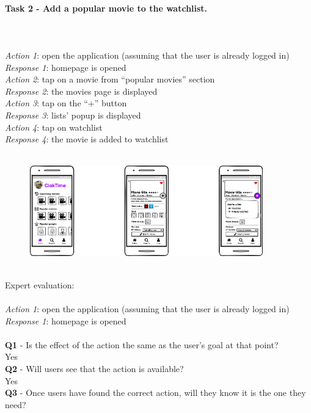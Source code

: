\documentclass[12pt, a4paper]{article}
\numberwithin{figure}{section}
\newcommand\tab[1][1cm]{\hspace*{#1}}
\begin{document}
\paragraph{Task 2 - Add a popular movie to the watchlist.}\mbox{}\\\\
\textit{Action 1}: open the application (assuming that the user is already logged in)\\ 
\textit{Response 1}: homepage is opened\\
\textit{Action 2}: tap on a movie from “popular movies” section\\
\textit{Response 2}: the movies page is displayed\\
\textit{Action 3}: tap on the “+” button\\
\textit{Response 3}: lists’ popup is displayed\\
\textit{Action 4}: tap on watchlist\\
\textit{Response 4}: the movie is added to watchlist\\\\
\begin{figure}[H]
	\centering
	\includegraphics[width=0.9\textwidth]{images/mockupAdd.png}\\
\end{figure}
\mbox{}\\
\noindent
Expert evaluation:\\\\
\textit{Action 1}: open the application (assuming that the user is already logged in)\\ 
\textit{Response 1}: homepage is opened\\\\
\textbf{Q1} - Is the effect of the action the same as the user’s goal at that point?\\
\tab Yes\\
\textbf{Q2} - Will users see that the action is available?\\
\tab Yes\\
\textbf{Q3} - Once users have found the correct action, will they know it is the one they need?\\
\end{document}

